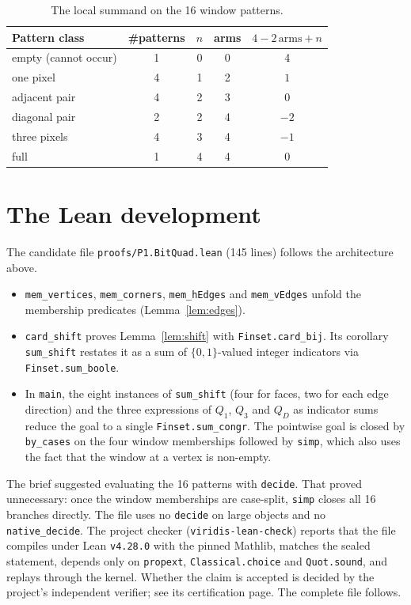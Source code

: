 \documentclass[11pt]{article}
\theoremstyle{definition}
\theoremstyle{remark}
\begin{document}
\begin{table}[h]
\centering
\begin{tabular}{lcccc}
\toprule
Pattern class & \#patterns & $n$ & arms & $4-2\,\mathrm{arms}+n$\\
\midrule
empty (cannot occur) & 1 & 0 & 0 & 4\\
one pixel & 4 & 1 & 2 & $1$\\
adjacent pair & 4 & 2 & 3 & $0$\\
diagonal pair & 2 & 2 & 4 & $-2$\\
three pixels & 4 & 3 & 4 & $-1$\\
full & 1 & 4 & 4 & $0$\\
\bottomrule
\end{tabular}
\caption{The local summand on the 16 window patterns.}
\label{tab:patterns}
\end{table}

\section{The Lean development}

The candidate file \texttt{proofs/P1.BitQuad.lean} (145 lines) follows the
architecture above.
\begin{itemize}
\item \texttt{mem\_vertices}, \texttt{mem\_corners}, \texttt{mem\_hEdges} and
  \texttt{mem\_vEdges} unfold the membership predicates (Lemma~\ref{lem:edges}).
\item \texttt{card\_shift} proves Lemma~\ref{lem:shift} with
  \texttt{Finset.card\_bij}. Its corollary \texttt{sum\_shift} restates it as a
  sum of $\{0,1\}$-valued integer indicators via \texttt{Finset.sum\_boole}.
\item In \texttt{main}, the eight instances of \texttt{sum\_shift} (four for
  faces, two for each edge direction) and the three expressions of $Q_1$, $Q_3$
  and $Q_D$ as indicator sums reduce the goal to a single
  \texttt{Finset.sum\_congr}. The pointwise goal is closed by
  \texttt{by\_cases} on the four window memberships followed by \texttt{simp},
  which also uses the fact that the window at a vertex is non-empty.
\end{itemize}
The brief suggested evaluating the 16 patterns with \texttt{decide}. That
proved unnecessary: once the window memberships are case-split, \texttt{simp}
closes all 16 branches directly. The file uses no \texttt{decide} on large
objects and no \texttt{native\_decide}. The project checker
(\texttt{viridis-lean-check}) reports that the file compiles under Lean
\texttt{v4.28.0} with the pinned Mathlib, matches the sealed statement, depends
only on \texttt{propext}, \texttt{Classical.choice} and \texttt{Quot.sound}, and
replays through the kernel. Whether the claim is accepted is decided by the
project's independent verifier; see its certification page. The complete file
follows.
\end{document}
